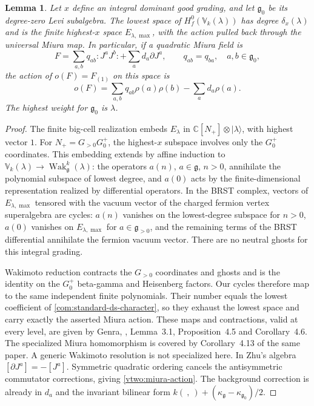 \documentclass[11pt,a4paper]{amsart}
\numberwithin{equation}{section}
\newtheorem{lemma}[theorem]{Lemma}
\theoremstyle{definition}
\theoremstyle{remark}
\newcommand{\C}{\mathbb C}
\newcommand{\g}{\mathfrak g}
\begin{document}
\begin{lemma}
\label{vtwo:miura-top}
Let $x$ define an integral dominant good grading, and let $\g_0$ be
its degree-zero Levi subalgebra. The lowest space of $H_f^0(\mathbb V_k(\lambda))$ has degree
$\delta_x(\lambda)$ and is the finite highest-$x$ space
$E_{\lambda,\max}$, with the action pulled back through the universal
Miura map. In particular, if a quadratic Miura field is
$$
 F=\sum_{a,b}q_{ab}:J^aJ^b:+\sum_a d_a\partial J^a,
 \qquad q_{ab}=q_{ba},\quad a,b\in\g_0,
$$
the action of $o(F)=F_{(1)}$ on this space is
\begin{equation}\label{vtwo:miura-action}
 o(F)=\sum_{a,b}q_{ab}\rho(a)\rho(b)-\sum_a d_a\rho(a).
\end{equation}
The highest weight for $\g_0$ is $\lambda$.
\end{lemma}
\begin{proof}
The finite big-cell realization embeds $E_\lambda$ in
$\C[N_+]\otimes|\lambda\rangle$, with highest vector $1$.
For $N_+=G_{>0}G_0^+$, the highest-$x$ subspace involves only the
$G_0^+$ coordinates. This embedding extends by affine induction to
$\mathbb V_k(\lambda)\to\operatorname{Wak}_{\g}^k(\lambda)$:
the operators $a(n)$, $a\in\g$, $n>0$, annihilate the polynomial
subspace of lowest degree, and $a(0)$ acts by the finite-dimensional
representation realized by differential operators. In the BRST
complex, vectors of $E_{\lambda,\max}$ tensored with the vacuum vector
of the charged fermion vertex superalgebra are cycles: $a(n)$ vanishes
on the lowest-degree subspace for $n>0$, $a(0)$ vanishes on
$E_{\lambda,\max}$ for $a\in\g_{>0}$, and the remaining terms of
the BRST differential annihilate the fermion vacuum vector. There are no neutral ghosts for this integral grading.

Wakimoto reduction contracts the $G_{>0}$ coordinates and ghosts and is
the identity on the $G_0^+$ beta-gamma and Heisenberg factors. Our cycles
therefore map to the same independent finite polynomials. Their
number equals the lowest coefficient of
\eqref{com:standard-ds-character}, so they exhaust the lowest
space and carry exactly the asserted Miura action. These maps and
contractions, valid at every level,
are given by Genra, \cite{Genra}, Lemma~3.1,
Proposition~4.5 and Corollary~4.6. The specialized Miura homomorphism
is covered by Corollary~4.13 of the same paper.
A generic Wakimoto resolution is not specialized here. In Zhu's algebra
$[\partial J^a]=-[J^a]$. Symmetric quadratic ordering cancels the
antisymmetric commutator corrections, giving
\eqref{vtwo:miura-action}. The background correction is already in
$d_a$ and the invariant bilinear form
$k(\ ,\ )+(\kappa_\g-\kappa_{\g_0})/2$.
\end{proof}
\end{document}
